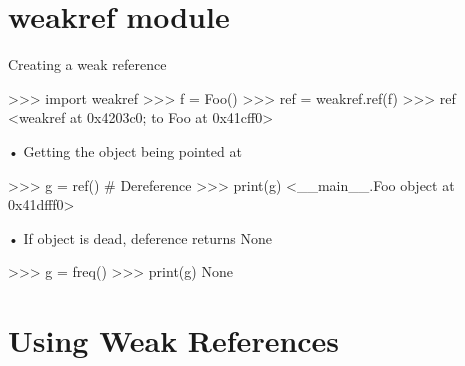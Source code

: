 \documentclass[
  letterpaper,
  DIV=11,
  numbers=noendperiod]{scrreprt}
\newenvironment{Shaded}{\begin{snugshade}}{\end{snugshade}}
\newcommand{\BaseNTok}[1]{\textcolor[rgb]{0.68,0.00,0.00}{#1}}
\newcommand{\ImportTok}[1]{\textcolor[rgb]{0.00,0.46,0.62}{#1}}
\newcommand{\NormalTok}[1]{\textcolor[rgb]{0.00,0.23,0.31}{#1}}
\newcommand{\OperatorTok}[1]{\textcolor[rgb]{0.37,0.37,0.37}{#1}}
\newcommand{\StringTok}[1]{\textcolor[rgb]{0.13,0.47,0.30}{#1}}
\begin{document}

\chapter{weakref module}\label{weakref-module}

Creating a weak reference

\begin{Shaded}
\begin{Highlighting}[]
\OperatorTok{\textgreater{}\textgreater{}\textgreater{}} \ImportTok{import}\NormalTok{ weakref}
\OperatorTok{\textgreater{}\textgreater{}\textgreater{}}\NormalTok{ f }\OperatorTok{=}\NormalTok{ Foo()}
\OperatorTok{\textgreater{}\textgreater{}\textgreater{}}\NormalTok{ ref }\OperatorTok{=}\NormalTok{ weakref.ref(f)}
\OperatorTok{\textgreater{}\textgreater{}\textgreater{}}\NormalTok{ ref}
\OperatorTok{\textless{}}\NormalTok{weakref at }\BaseNTok{0x4203c0}\OperatorTok{;}\NormalTok{ to }\StringTok{\textquotesingle{}Foo\textquotesingle{}}\NormalTok{ at }\BaseNTok{0x41cff0}\OperatorTok{\textgreater{}} 
\end{Highlighting}
\end{Shaded}

• Getting the object being pointed at

\begin{Shaded}
\begin{Highlighting}[]
\NormalTok{\textgreater{}\textgreater{}\textgreater{} g = ref() \# Dereference  }
\NormalTok{\textgreater{}\textgreater{}\textgreater{} print(g)  }
\NormalTok{\textless{}\_\_main\_\_.Foo object at 0x41dfff0\textgreater{} }
\end{Highlighting}
\end{Shaded}

• If object is dead, deference returns None

\begin{Shaded}
\begin{Highlighting}[]
\NormalTok{\textgreater{}\textgreater{}\textgreater{} g = freq()  }
\NormalTok{\textgreater{}\textgreater{}\textgreater{} print(g)  }
\NormalTok{None }
\end{Highlighting}
\end{Shaded}


\chapter{Using Weak References}\label{using-weak-references}
\end{document}
